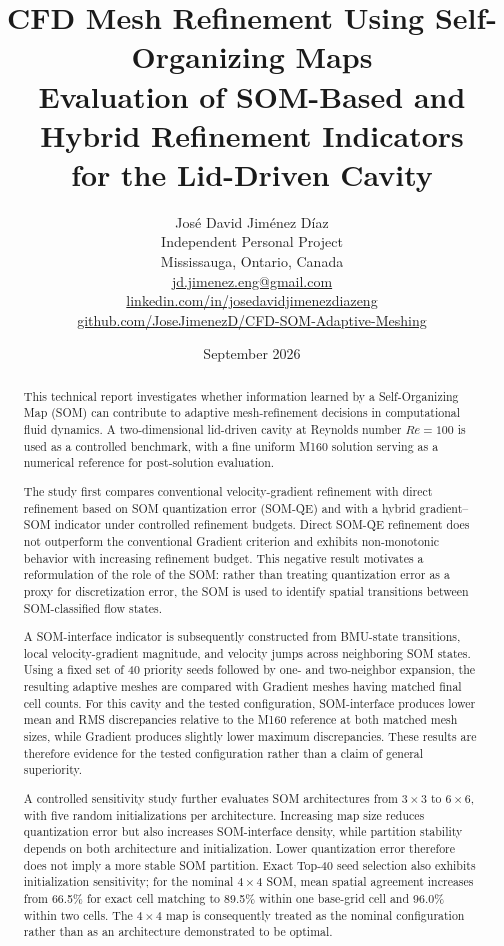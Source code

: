 \documentclass[11pt,a4paper]{article}
\title{
    \textbf{CFD Mesh Refinement Using Self-Organizing Maps}\\[0.4cm]
    \large Evaluation of SOM-Based and Hybrid Refinement Indicators\\
    for the Lid-Driven Cavity
}
\author{
    José David Jiménez Díaz\\[0.15cm]
    \small Independent Personal Project\\
    \small Mississauga, Ontario, Canada\\[0.1cm]
    \small \href{mailto:jd.jimenez.eng@gmail.com}{jd.jimenez.eng@gmail.com}\\
    \small \href{https://www.linkedin.com/in/josedavidjimenezdiazeng/}
    {linkedin.com/in/josedavidjimenezdiazeng}\\
    \small \href{https://github.com/JoseJimenezD/CFD-SOM-Adaptive-Meshing}
    {github.com/JoseJimenezD/CFD-SOM-Adaptive-Meshing}
}
\date{September 2026}
\begin{document}
\maketitle

\begin{abstract}
This technical report investigates whether information learned by a
Self-Organizing Map (SOM) can contribute to adaptive mesh-refinement
decisions in computational fluid dynamics. A two-dimensional lid-driven
cavity at Reynolds number \(Re=100\) is used as a controlled benchmark,
with a fine uniform M160 solution serving as a numerical reference for
post-solution evaluation.

The study first compares conventional velocity-gradient refinement with
direct refinement based on SOM quantization error (SOM-QE) and with a
hybrid gradient--SOM indicator under controlled refinement budgets.
Direct SOM-QE refinement does not outperform the conventional Gradient
criterion and exhibits non-monotonic behavior with increasing refinement
budget. This negative result motivates a reformulation of the role of the
SOM: rather than treating quantization error as a proxy for discretization
error, the SOM is used to identify spatial transitions between
SOM-classified flow states.

A SOM-interface indicator is subsequently constructed from BMU-state
transitions, local velocity-gradient magnitude, and velocity jumps across
neighboring SOM states. Using a fixed set of 40 priority seeds followed by
one- and two-neighbor expansion, the resulting adaptive meshes are compared
with Gradient meshes having matched final cell counts. For this cavity and
the tested configuration, SOM-interface produces lower mean and RMS
discrepancies relative to the M160 reference at both matched mesh sizes,
while Gradient produces slightly lower maximum discrepancies. These results
are therefore evidence for the tested configuration rather than a claim of
general superiority.

A controlled sensitivity study further evaluates SOM architectures from
\(3\times3\) to \(6\times6\), with five random initializations per
architecture. Increasing map size reduces quantization error but also
increases SOM-interface density, while partition stability depends on both
architecture and initialization. Lower quantization error therefore does
not imply a more stable SOM partition. Exact Top-40 seed selection also
exhibits initialization sensitivity; for the nominal \(4\times4\) SOM,
mean spatial agreement increases from 66.5\% for exact cell matching to
89.5\% within one base-grid cell and 96.0\% within two cells. The
\(4\times4\) map is consequently treated as the nominal configuration
rather than as an architecture demonstrated to be optimal.


\end{abstract}
\end{document}
